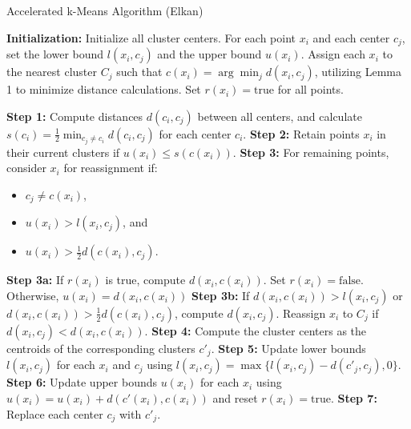 \begin{algorithm}
	\caption{Accelerated k-Means Algorithm (Elkan)}
	\label{alg:elkan}
	\begin{algorithmic}

		\State \textbf{Initialization:} Initialize all cluster centers. For each point $x_i$ and each center $c_j$, set the lower bound $l(x_i,c_j)$ and the upper bound $u(x_i)$. Assign each $x_i$ to the nearest cluster $C_j$ such that $c(x_i) = \arg \min_j d(x_i, c_j)$, utilizing Lemma 1 to minimize distance calculations. Set $r(x_i) = \text{true}$ for all points.


		\Repeat
		\State \textbf{Step 1:}  Compute distances $d(c_i, c_j)$ between all centers, and calculate $s(c_i) = \frac{1}{2} \min_{c_j \neq c_i} d(c_i, c_j)$ for each center $c_i$.
		\Statex
		\State \textbf{Step 2:}  Retain points $x_i$ in their current clusters if $u(x_i) \leq s(c(x_i))$.
		\Statex
		\State \textbf{Step 3:}  For remaining points, consider $x_i$ for reassignment if:
		\begin{itemize}
			\item $c_j \neq c(x_i)$,
			\item $u(x_i) > l(x_i, c_j)$, and
			\item $u(x_i) > \frac{1}{2}d(c(x_i), c_j)$.
		\end{itemize}
		\Statex
		\State \textbf{Step 3a:}  If $r(x_i)$ is true, compute $d(x_i, c(x_i))$. Set $r(x_i) = \text{false}$. Otherwise, $u(x_i) =d(x_i, c(x_i))$
		\Statex
		\State \textbf{Step 3b:} If $d(x_i, c(x_i)) > l(x_i, c_j)$ or $d(x_i, c(x_i)) > \frac{1}{2}d(c(x_i), c_j)$, compute $d(x_i, c_j)$. Reassign $x_i$ to $C_j$ if $d(x_i, c_j) < d(x_i, c(x_i))$.
		\Statex
		\State \textbf{Step 4:} Compute the cluster centers as the centroids of the corresponding clusters $c'_j$.
		\Statex
		\State \textbf{Step 5:} Update lower bounds $l(x_i, c_j)$ for each $x_i$ and $c_j$ using $l(x_i, c_j) = \max \{ l(x_i, c_j) - d(c'_j, c_j), 0 \}$.
		\Statex
		\State \textbf{Step 6:} Update upper bounds $u(x_i)$ for each $x_i$ using $u(x_i) = u(x_i) + d(c'(x_i), c(x_i))$ and reset $r(x_i) = \text{true}$.
		\Statex
		\State \textbf{Step 7:} Replace each center $c_j$ with $c'_j$.


	\end{algorithmic}
\end{algorithm}


